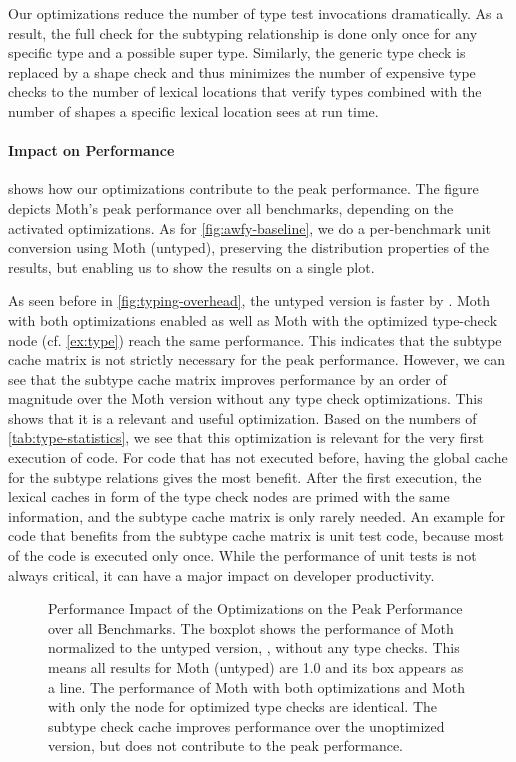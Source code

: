 Our optimizations reduce the number of type test invocations dramatically.
As a result, the full check for the subtyping relationship is done only once for
any specific type and a possible super type.
Similarly, the generic type check is replaced by a shape check
and thus minimizes the number of expensive type checks
to the number of lexical locations that verify types
combined with the number of shapes a specific lexical
location sees at run time.

\paragraph*{Impact on Performance}

 shows how our optimizations contribute
to the peak performance.
The figure depicts Moth's peak performance over
all benchmarks, depending on the activated optimizations.
As for \cref{fig:awfy-baseline},
we do a per-benchmark unit conversion using Moth (untyped),
preserving the distribution properties of the results,
but enabling us to show the results on a single plot.

As seen before in \cref{fig:typing-overhead}, the untyped version is faster by \OverheadTypingGMeanP.
Moth with both optimizations enabled as well as
Moth with the optimized type-check node (cf. \cref{ex:type})
reach the same performance.
This indicates that the subtype cache matrix is not strictly necessary for
the peak performance.
However, we can see that the subtype cache matrix improves performance
by an order of magnitude over the Moth version without any type check optimizations.
This shows that it is a relevant and useful optimization.
Based on the numbers of \cref{tab:type-statistics},
we see that this optimization is relevant for the very first execution of code.
For code that has not executed before,
having the global cache for the subtype relations gives the most benefit.
After the first execution, the lexical caches in form of the type check nodes
are primed with the same information, and the subtype cache matrix is only rarely needed.
An example for code that benefits from the subtype cache matrix is unit test code,
because most of the code is executed only once.
While the performance of unit tests is not always critical,
it can have a major impact on developer productivity.

\begin{figure}[htb]
  \centering
	\OptimizationOverview{}
  \caption{Performance Impact of the Optimizations on the Peak Performance over all Benchmarks.
  The boxplot shows the performance of Moth normalized to the untyped version, \ie,
  without any type checks.
  This means all results for Moth (untyped) are 1.0 and its box appears as a line.
  The performance of Moth with both optimizations and Moth
  with only the node for optimized type checks are identical.
  The subtype check cache improves performance over the unoptimized version,
  but does not contribute to the peak performance.
  }
	\label{fig:perf-impact-optimization}
\end{figure}

